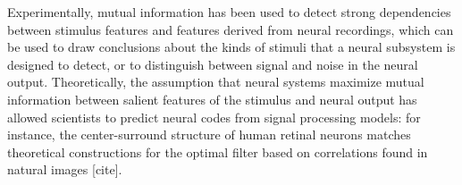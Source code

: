 Experimentally, mutual information has been used to detect strong
dependencies between stimulus features and features derived from
neural recordings, which can be used to draw conclusions about the
kinds of stimuli that a neural subsystem is designed to detect, or to
distinguish between signal and noise in the neural output.
Theoretically, the assumption that neural systems maximize mutual
information between salient features of the stimulus and neural output
has allowed scientists to predict neural codes from signal processing
models: for instance, the center-surround structure of human retinal
neurons matches theoretical constructions for the optimal filter based
on correlations found in natural images [cite].



